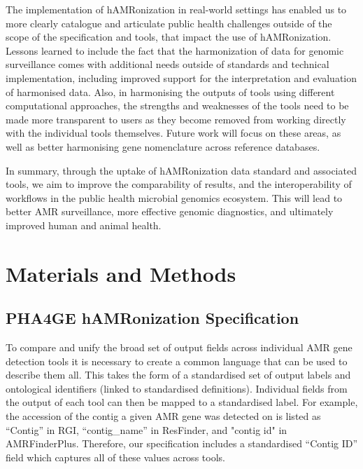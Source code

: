 The implementation of hAMRonization in real-world settings has enabled us to more clearly catalogue and articulate public health challenges outside of the scope of the specification and tools, that impact the use of hAMRonization. Lessons learned to include the fact that the harmonization of data for genomic surveillance comes with additional needs outside of standards and technical implementation, including improved support for the interpretation and evaluation of harmonised data. Also, in harmonising the outputs of tools using different computational approaches, the strengths and weaknesses of the tools need to be made more transparent to users as they become removed from working directly with the individual tools themselves. Future work will focus on these areas, as well as better harmonising gene nomenclature across reference databases.

In summary, through the uptake of hAMRonization data standard and associated tools, we aim to improve the comparability of results, and the interoperability of workflows in the public health microbial genomics ecosystem. This will lead to better AMR surveillance, more effective genomic diagnostics, and ultimately improved human and animal health. 

\section{Materials and Methods}

\subsection{PHA4GE hAMRonization Specification}

To compare and unify the broad set of output fields across individual AMR gene detection tools it is necessary to create a common language that can be used to describe them all.  This takes the form of a standardised set of output labels and ontological identifiers (linked to standardised definitions). Individual fields from the output of each tool can then be mapped to a standardised label. For example, the accession of the contig a given AMR gene was detected on is listed as “Contig” in RGI, “contig\_name” in ResFinder, and "contig id" in AMRFinderPlus. Therefore, our specification includes a standardised “Contig ID” field which captures all of these values across tools. 

